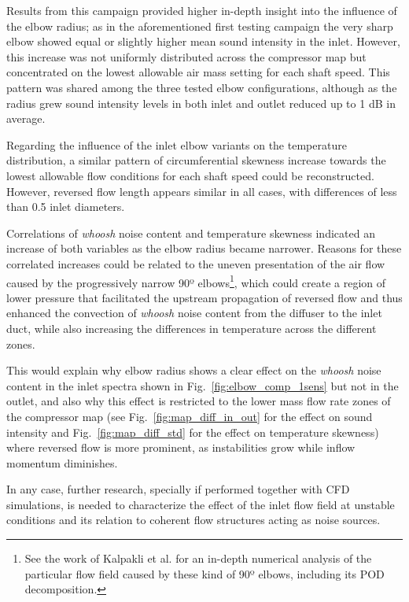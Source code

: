 Results from this campaign provided higher in-depth insight into the influence of the elbow radius; as in the aforementioned first testing campaign the very sharp elbow showed equal or slightly higher mean sound intensity in the inlet. However, this increase was not uniformly distributed across the compressor map but concentrated on the lowest allowable air mass setting for each shaft speed. This pattern was shared among the three tested elbow configurations, although as the radius grew sound intensity levels in both inlet and outlet reduced up to 1 dB in average.

Regarding the influence of the inlet elbow variants on the temperature distribution, a similar pattern of circumferential skewness increase towards the lowest allowable flow conditions for each shaft speed could be reconstructed. However, reversed flow length appears similar in all cases, with differences of less than 0.5 inlet diameters.

Correlations of \emph{whoosh} noise content and temperature skewness indicated an increase of both variables as the elbow radius became narrower. Reasons for these correlated increases could be related to the uneven presentation of the air flow caused by the progressively narrow 90º elbows\footnote{See the work of Kalpakli et al. \cite{kalpakli2013vortical,kalpakli2013turbulent} for an in-depth numerical analysis of the particular flow field caused by these kind of 90º elbows, including its POD decomposition.}, which could create a region of lower pressure that facilitated the upstream propagation of reversed flow and thus enhanced the convection of \emph{whoosh} noise content from the diffuser to the inlet duct, while also increasing the differences in temperature across the different zones.

This would explain why elbow radius shows a clear effect on the \emph{whoosh} noise content in the inlet spectra shown in Fig.~\ref{fig:elbow_comp_1sens} but not in the outlet, and also why this effect is restricted to the lower mass flow rate zones of the compressor map (see Fig.~\ref{fig:map_diff_in_out} for the effect on sound intensity and Fig.~\ref{fig:map_diff_std} for the effect on temperature skewness) where reversed flow is more prominent, as instabilities grow while inflow momentum diminishes. 

In any case, further research, specially if performed together with CFD simulations, is needed to characterize the effect of the inlet flow field at unstable conditions and its relation to coherent flow structures acting as noise sources.
